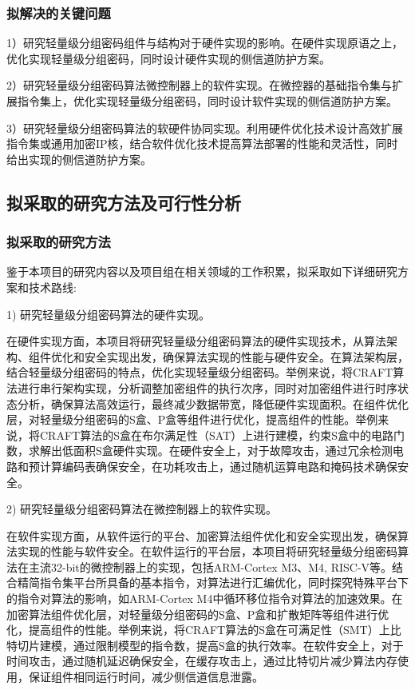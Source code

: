 \documentclass{ctexart}
\begin{document}
\subsubsection{拟解决的关键问题}

1）研究轻量级分组密码组件与结构对于硬件实现的影响。在硬件实现原语之上，优化实现轻量级分组密码，同时设计硬件实现的侧信道防护方案。

2）研究轻量级分组密码算法微控制器上的软件实现。在微控器的基础指令集与扩展指令集上，优化实现轻量级分组密码，同时设计软件实现的侧信道防护方案。

3）研究轻量级分组密码算法的软硬件协同实现。利用硬件优化技术设计高效扩展指令集或通用加密IP核，结合软件优化技术提高算法部署的性能和灵活性，同时给出实现的侧信道防护方案。

\subsection{拟采取的研究方法及可行性分析}
\subsubsection{拟采取的研究方法}

鉴于本项目的研究内容以及项目组在相关领域的工作积累，拟采取如下详细研究方案和技术路线:

1) 研究轻量级分组密码算法的硬件实现。

在硬件实现方面，本项目将研究轻量级分组密码算法的硬件实现技术，从算法架构、组件优化和安全实现出发，确保算法实现的性能与硬件安全。在算法架构层，结合轻量级分组密码的特点，优化实现轻量级分组密码。举例来说，将CRAFT算法进行串行架构实现，分析调整加密组件的执行次序，同时对加密组件进行时序状态分析，确保算法高效运行，最终减少数据带宽，降低硬件实现面积。在组件优化层，对轻量级分组密码的S盒、P盒等组件进行优化，提高组件的性能。举例来说，将CRAFT算法的S盒在布尔满足性（SAT）上进行建模，约束S盒中的电路门数，求解出低面积S盒硬件实现。在硬件安全上，对于故障攻击，通过冗余检测电路和预计算编码表确保安全，在功耗攻击上，通过随机运算电路和掩码技术确保安全。

2) 研究轻量级分组密码算法在微控制器上的软件实现。

在软件实现方面，从软件运行的平台、加密算法组件优化和安全实现出发，确保算法实现的性能与软件安全。在软件运行的平台层，本项目将研究轻量级分组密码算法在主流32-bit的微控制器上的实现，包括ARM-Cortex M3、M4, RISC-V等。结合精简指令集平台所具备的基本指令，对算法进行汇编优化，同时探究特殊平台下的指令对算法的影响，如ARM-Cortex M4中循环移位指令对算法的加速效果。在加密算法组件优化层，对轻量级分组密码的S盒、P盒和扩散矩阵等组件进行优化，提高组件的性能。举例来说，将CRAFT算法的S盒在可满足性（SMT）上比特切片建模，通过限制模型的指令数，提高S盒的执行效率。在软件安全上，对于时间攻击，通过随机延迟确保安全，在缓存攻击上，通过比特切片减少算法内存使用，保证组件相同运行时间，减少侧信道信息泄露。
\end{document}

